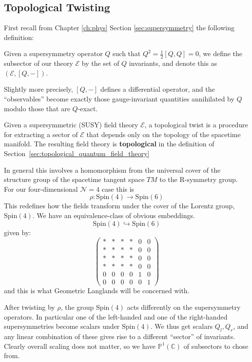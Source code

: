 
\subsection{Topological Twisting} %
\label{sub:topological_twisting}

	First recall from Chapter \ref{ch:phys} Section \ref{sec:supersymmetry} the following definition: 
	\begin{defn}[Subsector]
		Given a supersymmetry operator $Q$ such that $Q^2 = \frac{1}{2} [Q, Q] = 0$, we define the subsector of our theory $\mathcal E$ by the set of $Q$ invariants, and denote this as $(\mathcal E, [Q, -])$.
		
		Slightly more precisely, $[Q, -]$ defines a differential operator, and the ``observables'' become exactly those gauge-invariant quantities annihilated by $Q$ modulo those that are $Q$-exact.
	\end{defn}

	\begin{defn}
		Given a supersymmetric (SUSY) field theory $\mathcal E$, a topological twist is a procedure for extracting a sector of $\mathcal E$ that depends only on the topology of the spacetime manifold. The resulting field theory is \textbf{topological} in the definition of Section~\ref{sec:topological_quantum_field_theory}
	\end{defn}
	In general this involves a homomorphism from the universal cover of the structure group of the spacetime tangent space $TM$ to the R-symmetry group. For our four-dimensional $\mathcal N = 4$ case this is
	$$\rho : \mathrm{Spin}(4) \to \mathrm{Spin}(6)$$
	This redefines how the fields transform under the cover of the Lorentz group, $\mathrm{Spin}(4)$. We have an equivalence-class of obvious embeddings.
	$$\mathrm{Spin}(4) \hookrightarrow \mathrm{Spin}(6)$$
	given by:
	\[
		\begin{pmatrix}
			* & * & * & * & 0 & 0 \\
			* & * & * & * & 0 & 0 \\
			* & * & * & * & 0 & 0 \\
			* & * & * & * & 0 & 0 \\
			0 & 0 & 0 & 0 & 1 & 0 \\
			0 & 0 & 0 & 0 & 0 & 1
		\end{pmatrix}
	\]
	and this is what Geometric Langlands will be concerned with.
	
	After twisting by $\rho$, the group $\mathrm{Spin}(4)$ acts differently on the supersymmetry operators. In particular one of the left-handed and one of the right-handed supersymmetries become scalars under $\mathrm{Spin}(4)$. We thus get scalars $Q_l, Q_r$, and any linear combination of these gives rise to a different ``sector'' of invariants. Clearly overall scaling does not matter, so we have $\mathbb P^1 (\mathbb C)$ of subsectors to chose from.
	
